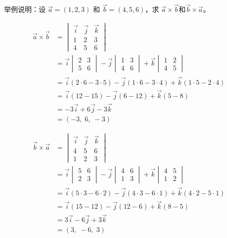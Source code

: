 \begin{myexample}
  举例说明：设 $\vec{a} = (1, 2, 3)$ 和 $\vec{b} = (4, 5, 6)$，求 $\vec{a} \times \vec{b}$和$\vec{b} \times \vec{a}$。

  \begin{align*}
    \vec{a} \times \vec{b}
    &= \begin{vmatrix}
       \vec{i} & \vec{j} & \vec{k} \\
       1 & 2 & 3 \\
       4 & 5 & 6
       \end{vmatrix} \\
    &= \vec{i} \begin{vmatrix} 2 & 3 \\ 5 & 6 \end{vmatrix}
       - \vec{j} \begin{vmatrix} 1 & 3 \\ 4 & 6 \end{vmatrix}
       + \vec{k} \begin{vmatrix} 1 & 2 \\ 4 & 5 \end{vmatrix} \\
    &= \vec{i}(2\cdot6 - 3\cdot5) - \vec{j}(1\cdot6 - 3\cdot4) + \vec{k}(1\cdot5 - 2\cdot4) \\
    &= \vec{i}(12 - 15) - \vec{j}(6 - 12) + \vec{k}(5 - 8) \\
    &= -3\vec{i} + 6\vec{j} - 3\vec{k} \\
    &= (-3,\; 6,\; -3)
    \end{align*}

    \begin{align*}
    \vec{b} \times \vec{a}
    &= \begin{vmatrix}
       \vec{i} & \vec{j} & \vec{k} \\
       4 & 5 & 6 \\
       1 & 2 & 3
       \end{vmatrix} \\
    &= \vec{i} \begin{vmatrix} 5 & 6 \\ 2 & 3 \end{vmatrix}
       - \vec{j} \begin{vmatrix} 4 & 6 \\ 1 & 3 \end{vmatrix}
       + \vec{k} \begin{vmatrix} 4 & 5 \\ 1 & 2 \end{vmatrix} \\
    &= \vec{i}(5\cdot3 - 6\cdot2) - \vec{j}(4\cdot3 - 6\cdot1) + \vec{k}(4\cdot2 - 5\cdot1) \\
    &= \vec{i}(15 - 12) - \vec{j}(12 - 6) + \vec{k}(8 - 5) \\
    &= 3\vec{i} - 6\vec{j} + 3\vec{k} \\
    &= (3,\; -6,\; 3)
    \end{align*}
\end{myexample}

